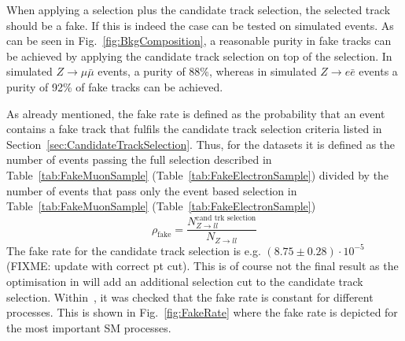 When applying a \Zlep selection plus the candidate track selection, the selected track should be a fake.
If this is indeed the case can be tested on simulated \Zlep events.
As can be seen in Fig.~\ref{fig:BkgComposition}, a reasonable purity in fake tracks can be achieved by applying the candidate track selection on top of the \Zlep selection.
In simulated $Z\rightarrow\mu\bar{\mu}$ events, a purity of 88\%, whereas in simulated $Z\rightarrow e\bar{e}$ events a purity of 92\% of fake tracks can be achieved.


As already mentioned, the fake rate is defined as the probability that an event contains a fake track that fulfils the candidate track selection criteria listed in Section~\ref{sec:CandidateTrackSelection}.
Thus, for the \Zlep datasets it is defined as the number of events passing the full selection described in Table~\ref{tab:FakeMuonSample} (Table~\ref{tab:FakeElectronSample}) divided by the number of events that pass only the event based selection in Table~\ref{tab:FakeMuonSample} (Table~\ref{tab:FakeElectronSample})
\begin{equation*}
\rho_{\text{fake}} = \frac{N_{Z\rightarrow ll}^{\text{cand trk selection}}}{N_{Z\rightarrow ll}}
\end{equation*}
The fake rate for the candidate track selection is e.g. $\left( 8.75 \pm 0.28 \right) \cdot 10^{-5}$  (FIXME: update with correct pt cut). 
This is of course not the final result as the optimisation in \pt will add an additional \pt selection cut to the candidate track selection.
Within~\cite{bib:CMS:DT_Thesis,bib:CMS:DT_8TeV_AN}, it was checked that the fake rate is constant for different processes.
This is shown in Fig.~\ref{fig:FakeRate} where the fake rate is depicted for the most important SM processes.
